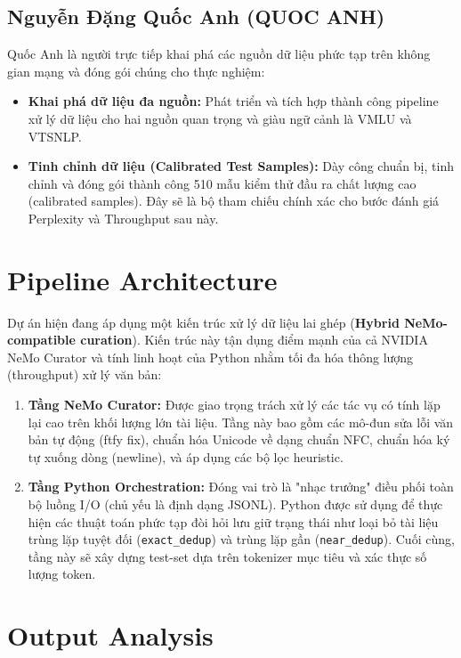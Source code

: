﻿\documentclass[12pt,a4paper]{article}
\begin{document}
\subsection{Nguyễn Đặng Quốc Anh (QUOC ANH)}
Quốc Anh là người trực tiếp khai phá các nguồn dữ liệu phức tạp trên không gian mạng và đóng gói chúng cho thực nghiệm:
\begin{itemize}
    \item \textbf{Khai phá dữ liệu đa nguồn:} Phát triển và tích hợp thành công pipeline xử lý dữ liệu cho hai nguồn quan trọng và giàu ngữ cảnh là VMLU và VTSNLP.
    \item \textbf{Tinh chỉnh dữ liệu (Calibrated Test Samples):} Dày công chuẩn bị, tinh chỉnh và đóng gói thành công 510 mẫu kiểm thử đầu ra chất lượng cao (calibrated samples). Đây sẽ là bộ tham chiếu chính xác cho bước đánh giá Perplexity và Throughput sau này.
\end{itemize}

\section{Pipeline Architecture}

Dự án hiện đang áp dụng một kiến trúc xử lý dữ liệu lai ghép (\textbf{Hybrid NeMo-compatible curation}). Kiến trúc này tận dụng điểm mạnh của cả NVIDIA NeMo Curator và tính linh hoạt của Python nhằm tối đa hóa thông lượng (throughput) xử lý văn bản:

\begin{enumerate}
    \item \textbf{Tầng NeMo Curator:} Được giao trọng trách xử lý các tác vụ có tính lặp lại cao trên khối lượng lớn tài liệu. Tầng này bao gồm các mô-đun sửa lỗi văn bản tự động (ftfy fix), chuẩn hóa Unicode về dạng chuẩn NFC, chuẩn hóa ký tự xuống dòng (newline), và áp dụng các bộ lọc heuristic.
    \item \textbf{Tầng Python Orchestration:} Đóng vai trò là "nhạc trưởng" điều phối toàn bộ luồng I/O (chủ yếu là định dạng JSONL). Python được sử dụng để thực hiện các thuật toán phức tạp đòi hỏi lưu giữ trạng thái như loại bỏ tài liệu trùng lặp tuyệt đối (\texttt{exact\_dedup}) và trùng lặp gần (\texttt{near\_dedup}). Cuối cùng, tầng này sẽ xây dựng test-set dựa trên tokenizer mục tiêu và xác thực số lượng token.
\end{enumerate}

\section{Output Analysis}
\end{document}
